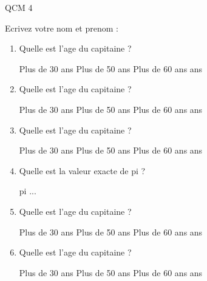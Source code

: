 \documentclass[a4paper, 11pt]{article}
\begin{document}
	QCM 4
	
	Ecrivez votre nom et prenom :
	\begin{qcm}
		\begin{enumerate}
			\item Quelle est l'age du capitaine ?
			\begin{tabenum} [1)]
				\tabenumitem Plus de 30 ans
				\tabenumitem Plus de 50 ans
				\tabenumitem Plus de 60 ans
				 ans
			\end{tabenum}
		\vspace{5mm}

			\item Quelle est l'age du capitaine ?
			\begin{tabenum} [1)]
				\tabenumitem Plus de 30 ans
				\tabenumitem Plus de 50 ans
				\tabenumitem Plus de 60 ans
				 ans
			\end{tabenum}
		\vspace{5mm}

			\item Quelle est l'age du capitaine ?
			\begin{tabenum} [1)]
				\tabenumitem Plus de 30 ans
				\tabenumitem Plus de 50 ans
				\tabenumitem Plus de 60 ans
				 ans
			\end{tabenum}
		\vspace{5mm}

			\item Quelle est la valeur exacte de pi ?
			\begin{tabenum} [1)]
				\tabenumitem pi
				...
			\end{tabenum}
		\vspace{5mm}

			\item Quelle est l'age du capitaine ?
			\begin{tabenum} [1)]
				\tabenumitem Plus de 30 ans
				\tabenumitem Plus de 50 ans
				\tabenumitem Plus de 60 ans
				 ans
			\end{tabenum}
		\vspace{5mm}

			\item Quelle est l'age du capitaine ?
			\begin{tabenum} [1)]
				\tabenumitem Plus de 30 ans
				\tabenumitem Plus de 50 ans
				\tabenumitem Plus de 60 ans
				 ans
			\end{tabenum}
		\vspace{5mm}

		\end{enumerate}
	\end{qcm}
	\newpage
	
\end{document}
